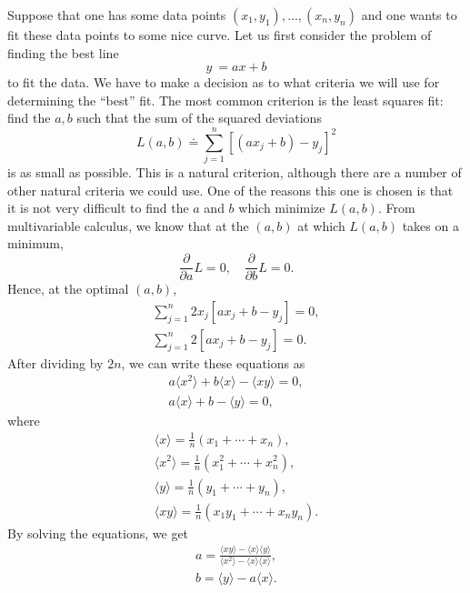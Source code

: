 \documentclass{stml-l}
\theoremstyle{definition}
\numberwithin{equation}{chapter}
\numberwithin{figure}{chapter}
\numberwithin{figure}{section}
\begin{document}
Suppose that one has some data points $(x_{1},y_{1}),
\ldots,(x_{n},y_{n})$ and one wants to fit these data points to some
nice curve. Let us first consider the problem of finding the best
line
\begin{equation*}
y\ =ax+b
\end{equation*}
to fit the data. We have to make a decision as to what criteria we
will use for determining the ``best'' fit. The most common criterion
is the least squares fit: find the $a,b$ such that the sum of the
squared deviations
\begin{equation*}
L(a,b)\doteq\sum\limits_{j=1}^{n}[(ax_{j}+b)-y_{j}]^{2}
\end{equation*}
is as small as possible. This is a natural criterion, although there
are a number of other natural criteria we could use. One of the
reasons this one is chosen is that it is not very difficult to find
the $a$ and $b$ which minimize $L(a,b)$. From multivariable
calculus, we know that at the $(a,b)$ at which $L(a,b)$ takes on a
minimum,
\begin{equation*}
\frac{\partial}{\partial a}L=0,\quad\frac{\partial}{\partial b}L=0.
\end{equation*}
Hence, at the optimal $(a,b)$,
\begin{gather*}
\sum\limits_{j=1}^{n}2x_{j}[ax_{j}+b-y_{j}]=0,\\
\sum\limits_{j=1}^{n}2[ax_{j}+b-y_{j}]=0.
\end{gather*}
After dividing by $2n$, we can write these equations as
\begin{gather*}
a\langle x^{2}\rangle+b\langle x\rangle-\langle xy\rangle=0,\\
a\langle x\rangle+b-\langle y\rangle=0,
\end{gather*}
where
\begin{gather*}
\langle x\rangle=\frac{1}{n}(x_{1}+\cdots+x_{n}),\\
\langle x^{2}\rangle=\frac{1}{n}(x_{1}^{2}+\cdots+x_{n}^{2}),\\
\langle y\rangle=\frac{1}{n}(y_{1}+\cdots+y_{n}),\\
\langle xy\rangle=\frac{1}{n}(x_{1}y_{1}+\cdots+x_{n}y_{n}).
\end{gather*}
By solving the equations, we get
\begin{gather*}
a=\frac{\langle xy\rangle-\langle x\rangle\langle y\rangle}{\langle
x^{2}\rangle-\langle x\rangle\langle x\rangle},\\
b=\langle y\rangle-a\langle x\rangle.
\end{gather*}
\end{document}
